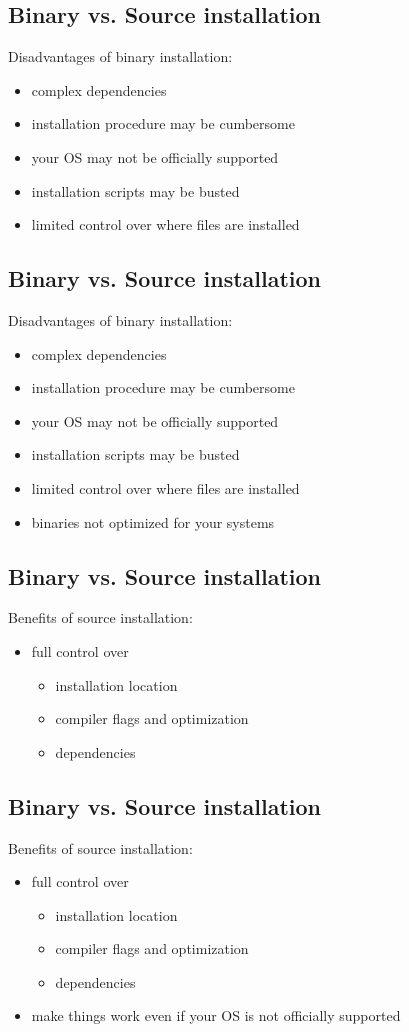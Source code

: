 \documentclass[xga]{xdvislides}
\begin{document}
\subsection{Binary vs. Source installation}
Disadvantages of binary installation:
\begin{itemize}
	\item complex dependencies
	\item installation procedure may be cumbersome
	\item your OS may not be officially supported
	\item installation scripts may be busted
	\item limited control over where files are installed
\end{itemize}

\subsection{Binary vs. Source installation}
Disadvantages of binary installation:
\begin{itemize}
	\item complex dependencies
	\item installation procedure may be cumbersome
	\item your OS may not be officially supported
	\item installation scripts may be busted
	\item limited control over where files are installed
	\item binaries not optimized for your systems
\end{itemize}

\subsection{Binary vs. Source installation}
Benefits of source installation:
\begin{itemize}
	\item full control over
		\begin{itemize}
			\item installation location
			\item compiler flags and optimization
			\item dependencies
		\end{itemize}
\end{itemize}

\subsection{Binary vs. Source installation}
Benefits of source installation:
\begin{itemize}
	\item full control over
		\begin{itemize}
			\item installation location
			\item compiler flags and optimization
			\item dependencies
		\end{itemize}
	\item make things work even if your OS is not officially supported
\end{itemize}
\end{document}
